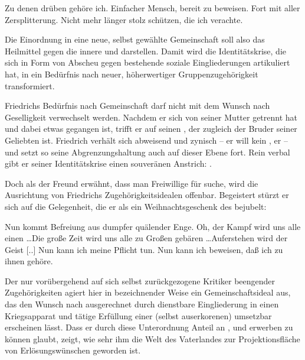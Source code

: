 \begin{BlockQuote}
  Zu denen drüben gehöre ich. Einfacher Mensch, bereit zu beweisen. Fort mit
  aller Zersplitterung. Nicht mehr länger stolz schützen, die ich
  verachte.
\end{BlockQuote}
Die Einordnung in eine neue, selbst gewählte Gemeinschaft soll also das
Heilmittel gegen die innere \Cite{Zersplitterung} und \Cite{Zerrissenheit}
darstellen. Damit wird die Identitätskrise, die sich in Form von Abscheu gegen
bestehende soziale Eingliederungen artikuliert hat, in ein Bedürfnis nach
neuer, höherwertiger Gruppenzugehörigkeit transformiert.


Friedrichs Bedürfnis nach Gemeinschaft darf nicht mit dem Wunsch nach
Geselligkeit verwechselt werden. Nachdem er sich von seiner Mutter getrennt
hat und dabei etwas \Cite{entzwei}  gegangen ist, trifft er
auf seinen
\Cite{Freund}, der zugleich der Bruder seiner Geliebten ist. Friedrich verhält
sich abweisend und zynisch -- er will kein \Cite{Mitleid}, er \Cite{brauche
  niemand} -- und setzt so seine Abgrenzungshaltung auch auf dieser Ebene
fort. Rein verbal gibt er seiner Identitätskrise einen souveränen Anstrich:
\Cite{Ich bin allein stark genug, ganz allein.} .

Doch als der Freund erwähnt, dass man Freiwillige für \Cite{den Kampf gegen
  die Wilden} suche, wird die Ausrichtung von Friedrichs Zugehörigkeitsidealen
offenbar. Begeistert stürzt er sich auf die Gelegenheit, die er als ein
Weihnachtsgeschenk des \Cite{Vaterlandes} bejubelt:

\begin{BlockQuote}
  Nun kommt Befreiung aus dumpfer quälender Enge. Oh, der Kampf wird uns alle
  einen \ldots Die große Zeit wird uns alle zu Großen gebären \ldots Auferstehen
  wird der Geist [..] Nun kann ich meine Pflicht tun. Nun kann ich beweisen, daß
  ich zu ihnen gehöre.
\end{BlockQuote}
Der nur vorübergehend auf sich selbst zurückgezogene Kritiker beengender
Zugehörigkeiten agiert hier in bezeichnender Weise ein Gemeinschaftsideal aus,
das den Wunsch nach \Cite{Befreiung} ausgerechnet durch dienstbare
Eingliederung in einen Kriegsapparat und tätige Erfüllung einer (selbst
auserkorenen) \Cite{Pflicht} umsetzbar erscheinen lässt. Dass er durch diese
Unterordnung Anteil an \Cite{Geist}, \Cite{Größe} und \Cite{Schönheit}
erwerben zu können glaubt, zeigt, wie sehr ihm die Welt des Vaterlandes zur
Projektionsfläche von Erlösungswünschen geworden ist.


